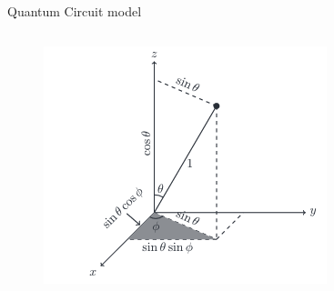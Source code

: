 \documentclass[9pt]{beamer}
\begin{document}
\begin{section}{Quantum Circuit model}
\begin{frame}
\begin{columns}
\begin{column}{0.35\textwidth}
                    \begin{figure}
                        \includegraphics[width=0.9\columnwidth]{image/L4_bloch_2.png}
                    \end{figure}
                \end{column}
            \end{columns}
        \end{frame}
        
    \end{section}
\end{document}
